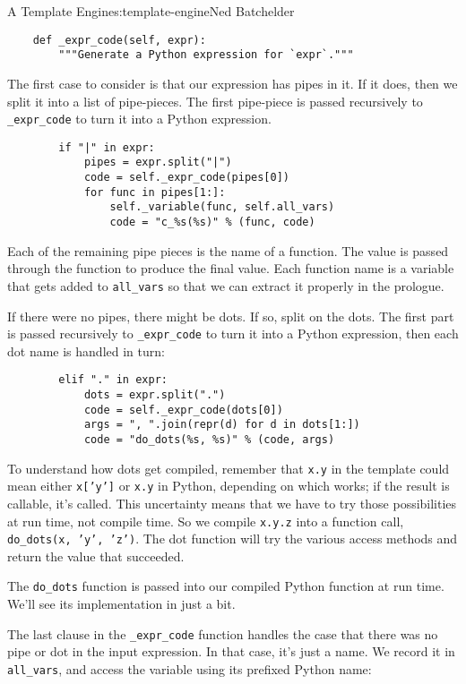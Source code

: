 \begin{aosachapter}{A Template Engine}{s:template-engine}{Ned Batchelder}
\begin{verbatim}
    def _expr_code(self, expr):
        """Generate a Python expression for `expr`."""
\end{verbatim}

The first case to consider is that our expression has pipes in it. If it
does, then we split it into a list of pipe-pieces. The first pipe-piece
is passed recursively to \texttt{\_expr\_code} to turn it into a Python
expression.

\begin{verbatim}
        if "|" in expr:
            pipes = expr.split("|")
            code = self._expr_code(pipes[0])
            for func in pipes[1:]:
                self._variable(func, self.all_vars)
                code = "c_%s(%s)" % (func, code)
\end{verbatim}

Each of the remaining pipe pieces is the name of a function. The value
is passed through the function to produce the final value. Each function
name is a variable that gets added to \texttt{all\_vars} so that we can
extract it properly in the prologue.

If there were no pipes, there might be dots. If so, split on the dots.
The first part is passed recursively to \texttt{\_expr\_code} to turn it
into a Python expression, then each dot name is handled in turn:

\begin{verbatim}
        elif "." in expr:
            dots = expr.split(".")
            code = self._expr_code(dots[0])
            args = ", ".join(repr(d) for d in dots[1:])
            code = "do_dots(%s, %s)" % (code, args)
\end{verbatim}

To understand how dots get compiled, remember that \texttt{x.y} in the
template could mean either \texttt{x{[}'y'{]}} or \texttt{x.y} in
Python, depending on which works; if the result is callable, it's
called. This uncertainty means that we have to try those possibilities
at run time, not compile time. So we compile \texttt{x.y.z} into a
function call, \texttt{do\_dots(x, 'y', 'z')}. The dot function will try
the various access methods and return the value that succeeded.

The \texttt{do\_dots} function is passed into our compiled Python
function at run time. We'll see its implementation in just a bit.

The last clause in the \texttt{\_expr\_code} function handles the case
that there was no pipe or dot in the input expression. In that case,
it's just a name. We record it in \texttt{all\_vars}, and access the
variable using its prefixed Python name:


\end{aosachapter}
